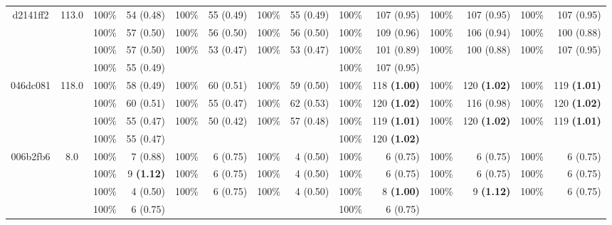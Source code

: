 \begin{adjustbox}{width=1\linewidth}
{\begin{tabular}{c c | cr  cr  cr || cr  cr  cr}
        \hline
   d2141ff2  &  113.0    &  100\%  & 54 (0.48)   &  100\%  & 55 (0.49)   &  100\%  & 55 (0.49)    &  100\%  & 107 (0.95)   &  100\%  & 107 (0.95)   &  100\%  & 107 (0.95)  \\ &    &  100\%  & 57 (0.50)   &  100\%  & 56 (0.50)   &  100\%  & 56 (0.50)    &  100\%  & 109 (0.96)   &  100\%  & 106 (0.94)   &  100\%  & 100 (0.88)  \\ &    &  100\%  & 57 (0.50)   &  100\%  & 53 (0.47)   &  100\%  & 53 (0.47)    &  100\%  & 101 (0.89)   &  100\%  & 100 (0.88)   &  100\%  & 107 (0.95)  \\ &    &  100\%  & 55 (0.49)     &   &  &  &   &  100\%  & 107 (0.95)  \\
        \hline
   046dc081  &  118.0    &  100\%  & 58 (0.49)   &  100\%  & 60 (0.51)   &  100\%  & 59 (0.50)    &  100\%  & 118 \textbf{(1.00)}    &  100\%  & 120 \textbf{(1.02)}    &  100\%  & 119 \textbf{(1.01)}   \\ &    &  100\%  & 60 (0.51)   &  100\%  & 55 (0.47)   &  100\%  & 62 (0.53)    &  100\%  & 120 \textbf{(1.02)}    &  100\%  & 116 (0.98)   &  100\%  & 120 \textbf{(1.02)}   \\ &    &  100\%  & 55 (0.47)   &  100\%  & 50 (0.42)   &  100\%  & 57 (0.48)    &  100\%  & 119 \textbf{(1.01)}    &  100\%  & 120 \textbf{(1.02)}    &  100\%  & 119 \textbf{(1.01)}   \\ &    &  100\%  & 55 (0.47)     &   &  &  &   &  100\%  & 120 \textbf{(1.02)}   \\
        \hline
   006b2fb6  &  8.0    &  100\%  & 7 (0.88)   &  100\%  & 6 (0.75)   &  100\%  & 4 (0.50)    &  100\%  & 6 (0.75)   &  100\%  & 6 (0.75)   &  100\%  & 6 (0.75)  \\ &    &  100\%  & 9 \textbf{(1.12)}    &  100\%  & 6 (0.75)   &  100\%  & 4 (0.50)    &  100\%  & 6 (0.75)   &  100\%  & 6 (0.75)   &  100\%  & 6 (0.75)  \\ &    &  100\%  & 4 (0.50)   &  100\%  & 6 (0.75)   &  100\%  & 4 (0.50)    &  100\%  & 8 \textbf{(1.00)}    &  100\%  & 9 \textbf{(1.12)}    &  100\%  & 6 (0.75)  \\ &    &  100\%  & 6 (0.75)     &   &  &  &  &  100\%  & 6 (0.75)  \\
        \hline
    
        
    \end{tabular}
}
\end{adjustbox}






